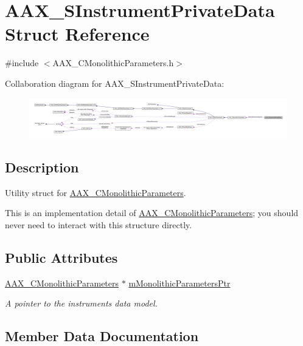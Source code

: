 \hypertarget{a01961}{}\section{A\+A\+X\+\_\+\+S\+Instrument\+Private\+Data Struct Reference}
\label{a01961}


{\ttfamily \#include $<$A\+A\+X\+\_\+\+C\+Monolithic\+Parameters.\+h$>$}



Collaboration diagram for A\+A\+X\+\_\+\+S\+Instrument\+Private\+Data\+:
\nopagebreak
\begin{figure}[H]
\begin{center}
\leavevmode
\includegraphics[width=350pt]{a01959}
\end{center}
\end{figure}


\subsection{Description}
Utility struct for \mbox{\hyperlink{a01969}{A\+A\+X\+\_\+\+C\+Monolithic\+Parameters}}. 

This is an implementation detail of \mbox{\hyperlink{a01969}{A\+A\+X\+\_\+\+C\+Monolithic\+Parameters}}; you should never need to interact with this structure directly. \subsection*{Public Attributes}
\begin{DoxyCompactItemize}
\item 
\mbox{\hyperlink{a01969}{A\+A\+X\+\_\+\+C\+Monolithic\+Parameters}} $\ast$ \mbox{\hyperlink{a01961_a92919c61cae3c04a28bfacb3c48d0120}{m\+Monolithic\+Parameters\+Ptr}}
\begin{DoxyCompactList}\small\item\em A pointer to the instrument\textquotesingle{}s data model. \end{DoxyCompactList}\end{DoxyCompactItemize}


\subsection{Member Data Documentation}
\mbox{\label{a01961_a92919c61cae3c04a28bfacb3c48d0120}} 
